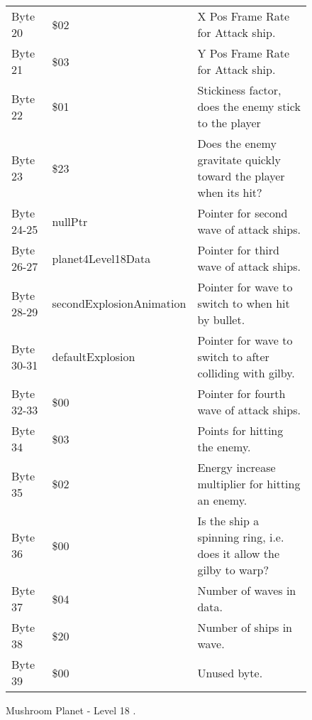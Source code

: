\begin{figure}[H]
{\begin{adjustbox}{width=12cm}
\begin{tabular}{lll}
 Byte 20    & \$02                      & X Pos Frame Rate for Attack ship.                                   \\
 Byte 21    & \$03                      & Y Pos Frame Rate for Attack ship.                                   \\
 Byte 22    & \$01                      & Stickiness factor, does the enemy stick to the player               \\
 Byte 23    & \$23                      & Does the enemy gravitate quickly toward the player when its hit?    \\
 Byte 24-25 & nullPtr                  & Pointer for second wave of attack ships.                            \\
 Byte 26-27 & planet4Level18Data       & Pointer for third wave of attack ships.                             \\
 Byte 28-29 & secondExplosionAnimation & Pointer for wave to switch to when hit by bullet.                   \\
 Byte 30-31 & defaultExplosion         & Pointer for  wave to switch to after colliding with gilby.          \\
 Byte 32-33 & \$00                      & Pointer for fourth wave of attack ships.                            \\
 Byte 34    & \$03                      & Points for hitting the enemy.                                       \\
 Byte 35    & \$02                      & Energy increase multiplier for hitting an enemy.                    \\
 Byte 36    & \$00                      & Is the ship a spinning ring, i.e. does it allow the gilby to warp?  \\
 Byte 37    & \$04                      & Number of waves in data.                                            \\
 Byte 38    & \$20                      & Number of ships in wave.                                            \\
 Byte 39    & \$00                      & Unused byte.                                                        \\
\bottomrule
\end{tabular}

  \end{adjustbox}

  }\caption*{Mushroom Planet - Level 18
.}
\end{figure}

